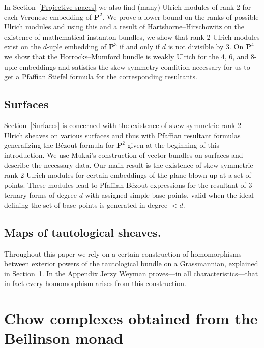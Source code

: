 \documentclass{jams-l}
\theoremstyle{definition}
\theoremstyle{remark}
\newcommand{\PP}{{\mathbf P}}
\begin{document}
In Section~\ref{Projective spaces} we also find (many) Ulrich modules of rank 2 for each
Veronese embedding of $\PP^2$. 
We prove a lower bound on the ranks of possible Ulrich modules
and using this and a result of Hartshorne--Hirschowitz on the 
existence of mathematical instanton
bundles, we show that rank 2 Ulrich modules exist on the $d$-uple embedding
of $\PP^3$ if and only if $d$ is not divisible by 3. 
On $\PP^4$ we show that the Horrocks--Mumford bundle is weakly Ulrich
for the 4, 6, and 8-uple embeddings and satisfies
the skew-symmetry condition necessary for us to get a Pfaffian Stiefel formula
for the corresponding resultants.

\subsection*{Surfaces}

Section~\ref{Surfaces} is concerned with the existence of skew-symmetric rank 2 Ulrich sheaves
on various surfaces and thus with Pfaffian resultant formulas generalizing the B\'ezout
formula for $\PP^2$ given at the beginning of this introduction. We use Mukai's
construction of vector bundles on surfaces and describe the necessary data. Our main result 
is the existence of skew-symmetric rank 2 Ulrich 
modules for certain embeddings
of the plane blown up at a set of points.
These modules lead to Pfaffian B\'ezout expressions for the
resultant of 3 ternary forms of degree $d$ with assigned simple base points, valid when
the ideal defining the set of base points is generated in degree  $<d$.

\subsection*{Maps of tautological sheaves. }
Throughout this paper we rely on a certain construction of
homomorphisms between exterior powers of the tautological bundle
on a Grassmannian, explained in Section~\ref{chow complex}. In the Appendix
Jerzy Weyman proves---in all characteristics---that 
in fact every homomorphism arises from this construction.

\section{Chow complexes obtained from the Beilinson monad}
\label{chow complex}
\end{document}
